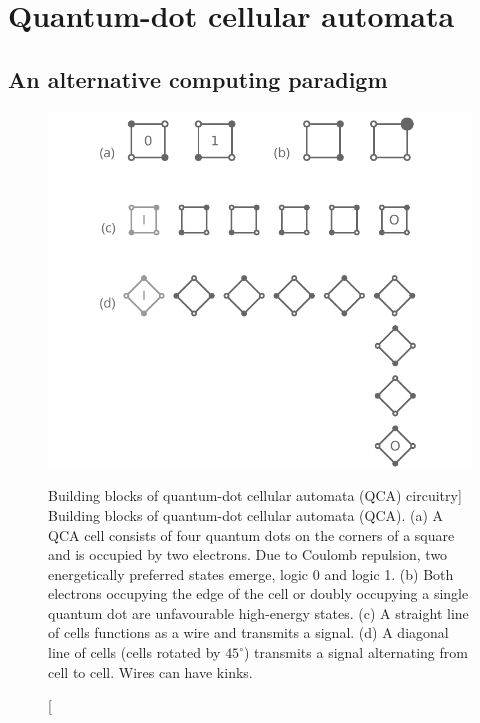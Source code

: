 \chapter{Quantum-dot cellular automata}
\label{ch:QCA_intro}
\graphicspath{{../gfx/chapter01/}}

\section{An alternative computing paradigm}
\label{sec:an_alternative_computing_paradigm}

\begin{figure}
  \center
  \includegraphics{intro_qca}
  \caption
[Building blocks of quantum-dot cellular automata (QCA) circuitry]
{
Building blocks of quantum-dot cellular automata (QCA). (a) A QCA cell consists
of four quantum dots on the corners of a square and is occupied by two
electrons. Due to Coulomb repulsion, two energetically preferred states emerge,
logic 0 and logic 1. (b) Both electrons occupying the edge of the cell or
doubly occupying a single quantum dot are unfavourable high-energy states. (c) A
straight line of cells functions as a wire and transmits a signal. (d) A
diagonal line of cells (cells rotated by $45^{\circ}$) transmits a signal
alternating from cell to cell. Wires can have kinks.
}
  \label{fig:intro_qca}
\end{figure}
%
